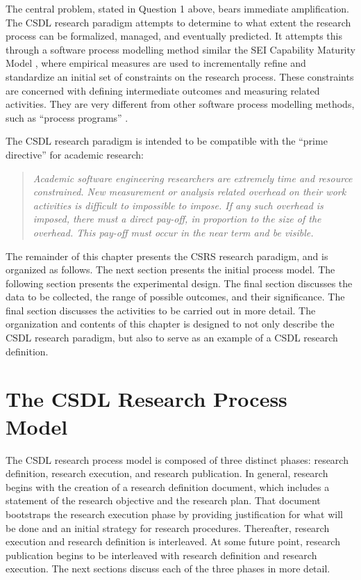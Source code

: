 The central problem, stated in Question 1 above, bears immediate
amplification. The CSDL research paradigm attempts to determine to what
extent the research process can be formalized, managed, and eventually
predicted.  It attempts this through a software process modelling method
similar the SEI Capability Maturity Model \cite{Paulk93}, where empirical
measures are used to incrementally refine and standardize an initial set of
constraints on the research process. These constraints are concerned with
defining intermediate outcomes and measuring related activities.  They are
very different from other software process modelling methods, such as
``process programs'' \cite{Osterweil87}.

The CSDL research paradigm is intended to be compatible with the ``prime
directive'' for academic research:

\begin{quotation}
  {\em Academic software engineering researchers are extremely time and
  resource constrained. New measurement or analysis related overhead on
  their work activities is difficult to impossible to impose.  If any
  such overhead is imposed, there must a direct pay-off, in proportion to
  the size of the overhead.  This pay-off must occur in the near term and
  be visible.}
\end{quotation}

The remainder of this chapter presents the CSRS research paradigm, and is
organized as follows.  The next section presents the initial process model.
The following section presents the experimental design.  The final section
discusses the data to be collected, the range of possible outcomes, and
their significance.  The final section discusses the activities to be
carried out in more detail.  The organization and contents of this chapter
is designed to not only describe the CSDL research paradigm, but also to
serve as an example of a CSDL research definition.

\section{The CSDL Research Process Model}

The CSDL research process model is composed of three distinct phases:
research definition, research execution, and research publication.  In
general, research begins with the creation of a research definition
document, which includes a statement of the research objective and the
research plan.  That document bootstraps the research execution phase by
providing justification for what will be done and an initial strategy for
research procedures.  Thereafter, research execution and research
definition is interleaved.  At some future point, research publication
begins to be interleaved with research definition and research execution.
The next sections discuss each of the three phases in more detail.

